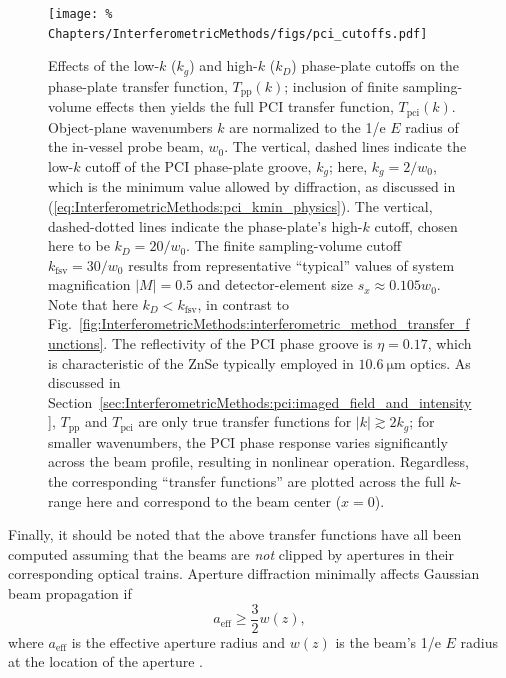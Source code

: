 \begin{figure}
  \centering
  \texttt{[image: \%
    Chapters/InterferometricMethods/figs/pci\_cutoffs.pdf]}
  \caption[Effects of phase-plate and finite sampling-volume cutoffs
      on the PCI transfer function]{%
    Effects of the low-$k$ ($k_g$) and high-$k$ ($k_D$) phase-plate cutoffs
    on the phase-plate transfer function, $T_{\text{pp}}(k)$;
    inclusion of finite sampling-volume effects
    then yields the full PCI transfer function, $T_{\text{pci}}(k)$.
    Object-plane wavenumbers $k$ are normalized
    to the 1/e $E$ radius of the in-vessel probe beam, $w_0$.
    The vertical, dashed lines indicate
    the low-$k$ cutoff of the PCI phase-plate groove, $k_g$;
    here, $k_g = 2 / w_0$,
    which is the minimum value allowed by diffraction,
    as discussed in
    (\ref{eq:InterferometricMethods:pci_kmin_physics}).
    The vertical, dashed-dotted lines indicate
    the phase-plate's high-$k$ cutoff,
    chosen here to be $k_D = 20 / w_0$.
    The finite sampling-volume cutoff $k_{\text{fsv}} = 30 / w_0$
    results from representative ``typical'' values of
    system magnification $|M| = 0.5$ and
    detector-element size $s_x \approx 0.105 w_0$.
    Note that here $k_D < k_{\text{fsv}}$, in contrast to
    Fig.~\ref{fig:InterferometricMethods:interferometric_method_transfer_functions}.
    The reflectivity of the PCI phase groove is $\eta = 0.17$,
    which is characteristic of the ZnSe typically
    employed in $\SI{10.6}{\micro\meter}$ optics.
    As discussed in
    Section~\ref{sec:InterferometricMethods:pci:imaged_field_and_intensity},
    $T_{\text{pp}}$ and $T_{\text{pci}}$ are only true transfer functions
    for $|k| \gtrsim 2 k_g$;
    for smaller wavenumbers, the PCI phase response
    varies significantly across the beam profile,
    resulting in nonlinear operation.
    Regardless, the corresponding ``transfer functions'' are plotted
    across the full $k$-range here and
    correspond to the beam center ($x = 0$).
  }
\label{fig:InterferometricMethods:pci_cutoffs}
\end{figure}

Finally, it should be noted that the above transfer functions
have all been computed assuming that the beams are \emph{not} clipped
by apertures in their corresponding optical trains.
Aperture diffraction minimally affects Gaussian beam propagation if
\begin{equation}
  a_{\text{eff}} \geq \frac{3}{2} w(z),
  \label{eq:InterferometricMethods:aperture_radius_for_minimal_diffraction}
\end{equation}
where $a_{\text{eff}}$ is the effective aperture radius and
$w(z)$ is the beam's 1/e $E$ radius at the location of the aperture
\cite{campbell_josa69, rost_diffraction_pc14}.


